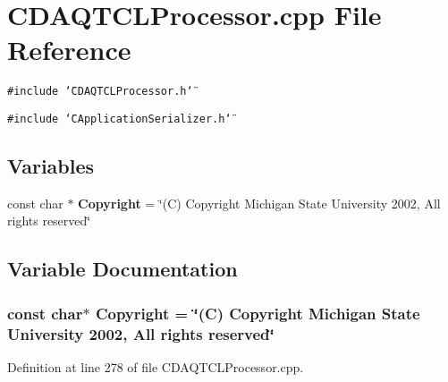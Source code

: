 \section{CDAQTCLProcessor.cpp File Reference}
\label{CDAQTCLProcessor_8cpp}
{\tt \#include \char`\"{}CDAQTCLProcessor.h\char`\"{}}\par
{\tt \#include \char`\"{}CApplication\-Serializer.h\char`\"{}}\par
\subsection*{Variables}
\begin{CompactItemize}
\item 
const char $\ast$ {\bf Copyright} = \char`\"{}(C) Copyright Michigan State University 2002, All rights reserved\char`\"{}
\end{CompactItemize}


\subsection{Variable Documentation}
\subsubsection{\setlength{\rightskip}{0pt plus 5cm}const char$\ast$ Copyright = \char`\"{}(C) Copyright Michigan State University 2002, All rights reserved\char`\"{}\hspace{0.3cm}{\tt  [static]}}\label{CDAQTCLProcessor_8cpp_a0}




Definition at line 278 of file CDAQTCLProcessor.cpp.